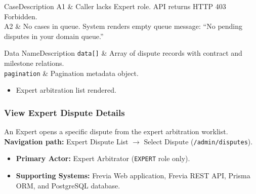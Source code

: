 \begin{flowtable}{Case}{Description}
      A1 & Caller lacks Expert role. API returns HTTP 403 Forbidden.\\ \hline
      A2 & No cases in queue. System renders empty queue message: ``No pending disputes in your domain queue.''\\ \hline
\end{flowtable}

\begin{specdatatable}{Data Name}{Description}
      \texttt{data[]} & Array of dispute records with contract and milestone relations.\\ \hline
      \texttt{pagination} & Pagination metadata object.\\ \hline
\end{specdatatable}

\begin{itemize}[leftmargin=1.6em,topsep=3pt,itemsep=2pt,parsep=0pt,label=$\bullet$]
      \item Expert arbitration list rendered.
\end{itemize}

\subsubsection{ View Expert Dispute Details}

An Expert opens a specific dispute from the expert arbitration worklist.\newline
\textbf{Navigation path:} Expert Dispute List $\rightarrow$ Select Dispute (\texttt{/admin/disputes}).


\begin{itemize}[leftmargin=1.6em,topsep=3pt,itemsep=2pt,parsep=0pt,label=$\bullet$]
      \item \textbf{Primary Actor:} Expert Arbitrator (\texttt{EXPERT} role only).
      \item \textbf{Supporting Systems:} Frevia Web application, Frevia REST API, Prisma ORM, and PostgreSQL database.
\end{itemize}

